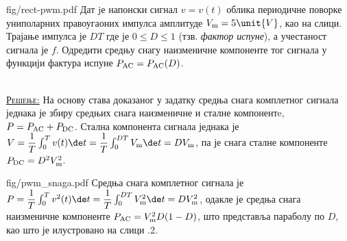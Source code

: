 \begin{slikaDesno}{fig/rect-pwm.pdf}
    \PID \label{z:snaga_pwm}
    Дат jе напонски сигнал $v = v(t)$ облика периодичне поворке униполарних правоугаоних 
    импулса амплитуде ${V_{\rm m} = 5\unit{V}}$, као на слици. Трајање импулса је $DT$ где је 
    $0 \leq D \leq 1$ (тзв. \textit{фактор испуне}), а учестаност сигнала је $f$. Одредити средњу снагу 
    наизменичне компоненте тог сигнала у функцији фактура испуне $P_{\rm AC} = P_{\rm AC}(D)$. 
\end{slikaDesno}
\\[2mm]

\textsc{\underline{Решење:}}
На основу става доказаног у задатку  средња снага комплетног сигнала
једнака је збиру средњих снага наизменичне и сталне компонентe, $P = P_{\rm AC} + P_{\rm DC}$. 
Стална компонента сигнала једнака је 
$V = \dfrac{1}{T} \int_0^T v(t) \de t = \dfrac{1}{T} \int_0^{DT} V_{\rm m} \de t = DV_{\rm m}$, па је 
снага сталне компоненте $P_{\rm DC} = D^2 V_{\rm m}^2$. 

\begin{slikaDesno}{fig/pwm_snaga.pdf}
    Средња снага комплетног сигнала је 
    $P = \dfrac{1}{T} \int_0^T v^2(t) \de t = \dfrac{1}{T} \int_0^{DT} V_{\rm m}^2 \de t = DV_{\rm m}^2$,
    одакле је средња снага наизменичне компоненте   
    $P_{\rm AC} = V_{\rm m}^2 D(1 - D)$, што представља параболу по $D$, као што је илустровано на слици \ID.2.
\end{slikaDesno}
